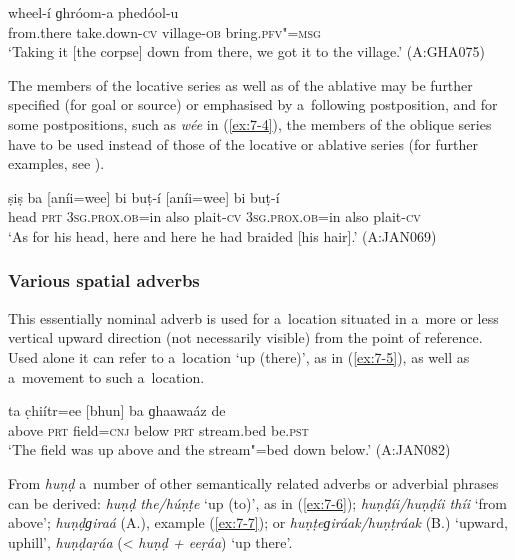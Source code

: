 \begin{exe}
\ex
\label{ex:7-3}
\gll [eetáai] wheel-í ɡhróom-a phedóol-u \\
from.there take.down-\textsc{cv} village-\textsc{ob} bring.\textsc{pfv"=msg} \\
\glt `Taking it [the corpse] down from there, we got it to the village.' (A:GHA075)
\end{exe}
The members of the locative series as well as of the ablative may be further specified (for goal or
source) or emphasised by a~following postposition, and for some postpositions, such as \textit{wée}
in (\ref{ex:7-4}), the members of the oblique series have to be used instead of those of the
locative or ablative series (for further examples, see ).

\begin{exe}
\ex
\label{ex:7-4}
\gll ṣiṣ ba [aníi=wee] bi buṭ-í [aníi=wee]  bi buṭ-í \\
head \textsc{prt} \textsc{3sg.prox.ob=}in also plait-\textsc{cv} \textsc{3sg.prox.ob=}in also plait-\textsc{cv} \\
\glt `As for his head, here and here he had braided [his hair].' (A:JAN069)
\end{exe}

\subsubsection*{Various spatial adverbs}

 This essentially nominal adverb is used for a~location situated in a~more or less vertical upward direction (not necessarily visible) from the point of reference. Used alone it can refer to a~location `up (there)', as in (\ref{ex:7-5}), as well as a~movement to such a~location.

\begin{exe}
\ex
\label{ex:7-5}
\gll [huṇḍ] ta c̣hiítr=ee [bhun] ba ɡhaawaáz de  \\
above \textsc{prt} field=\textsc{cnj} below \textsc{prt} stream.bed be.\textsc{pst} \\
\glt `The field was up above and the stream"=bed down below.' (A:JAN082)
\end{exe}
From \textit{huṇḍ} a~number of other semantically related adverbs or adverbial phrases can be derived: \textit{huṇḍ the/húṇṭe} `up (to)', as in (\ref{ex:7-6}); \textit{huṇḍíi/huṇḍíi thíi} `from above'; \textit{huṇḍɡiraá} (A.), example (\ref{ex:7-7}); or \textit{huṇṭeɡiráak/huṇṭráak} (B.) `upward, uphill', \textit{huṇḍaṛáa} ({\textless} \textit{huṇḍ + eeṛáa}) `up there'.

